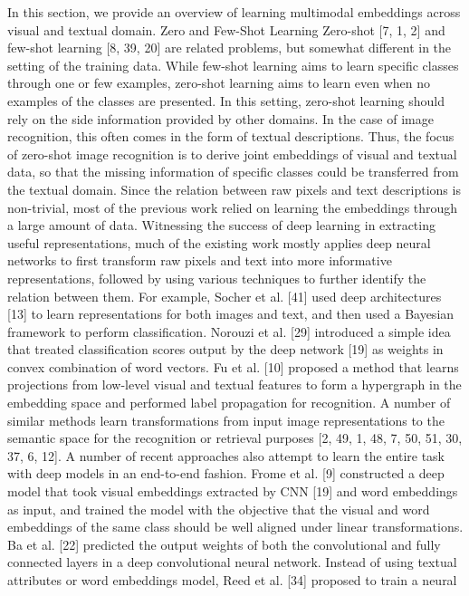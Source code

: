 \documentclass[10pt,twocolumn,letterpaper]{article}
\begin{document}
In this section, we provide an overview of learning multimodal embeddings across visual and textual domain.
Zero and Few-Shot Learning
Zero-shot [7, 1, 2] and few-shot learning [8, 39, 20] are
related problems, but somewhat different in the setting of
the training data. While few-shot learning aims to learn specific classes through one or few examples, zero-shot learning aims to learn even when no examples of the classes are
presented. In this setting, zero-shot learning should rely on
the side information provided by other domains. In the case
of image recognition, this often comes in the form of textual
descriptions. Thus, the focus of zero-shot image recognition is to derive joint embeddings of visual and textual data,
so that the missing information of specific classes could be
transferred from the textual domain.
Since the relation between raw pixels and text descriptions is non-trivial, most of the previous work relied on
learning the embeddings through a large amount of data.
Witnessing the success of deep learning in extracting useful representations, much of the existing work mostly applies deep neural networks to first transform raw pixels and
text into more informative representations, followed by using various techniques to further identify the relation between them. For example, Socher et al. [41] used deep
architectures [13] to learn representations for both images
and text, and then used a Bayesian framework to perform
classification. Norouzi et al. [29] introduced a simple idea
that treated classification scores output by the deep network [19] as weights in convex combination of word vectors. Fu et al. [10] proposed a method that learns projections from low-level visual and textual features to form
a hypergraph in the embedding space and performed label
propagation for recognition. A number of similar methods
learn transformations from input image representations to
the semantic space for the recognition or retrieval purposes
[2, 49, 1, 48, 7, 50, 51, 30, 37, 6, 12].
A number of recent approaches also attempt to learn
the entire task with deep models in an end-to-end fashion.
Frome et al. [9] constructed a deep model that took visual
embeddings extracted by CNN [19] and word embeddings
as input, and trained the model with the objective that the
visual and word embeddings of the same class should be
well aligned under linear transformations. Ba et al. [22]
predicted the output weights of both the convolutional and
fully connected layers in a deep convolutional neural network. Instead of using textual attributes or word embeddings model, Reed et al. [34] proposed to train a neural
\end{document}
